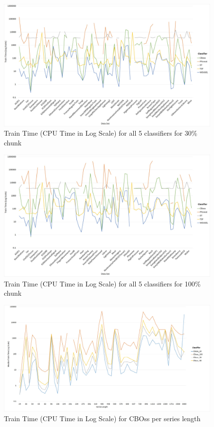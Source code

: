   \begin{figure} [!htb]
    \centering
    \includegraphics[width=\textwidth]{./Chapters/06 Results/Duration_30pct.jpg}
    \caption{Train Time (CPU Time in Log Scale) for all 5 classifiers for 30\% chunk}
    \label{fig:Duration30Line}
  \end{figure}
  
  \begin{figure} [!htb]
    \centering
    \includegraphics[width=\textwidth]{./Chapters/06 Results/Duration_100pct.jpg}
    \caption{Train Time (CPU Time in Log Scale) for all 5 classifiers for 100\% chunk}
    \label{fig:Duration100Line}
  \end{figure}
  \begin{figure} [!htb]
    \centering
    \includegraphics[width=\textwidth]{./Chapters/06 Results/Duration_cboss_length.jpg}
    \caption{Train Time (CPU Time in Log Scale) for CBOss per series length}
  \end{figure}
  
